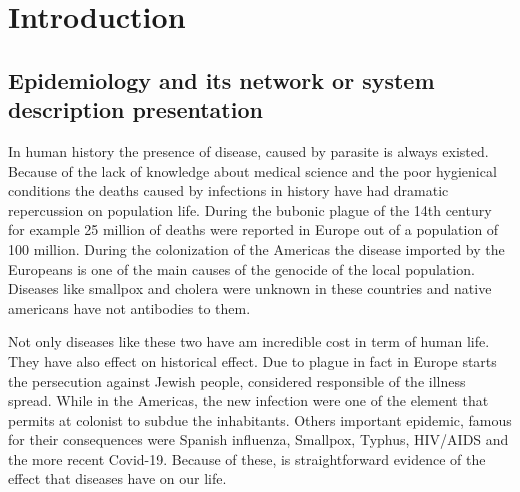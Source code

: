 \part{Introduction}

\chapter{Epidemiology and its network or system description presentation}

In human history the presence of disease, caused by parasite is always existed. 
Because of the lack of knowledge about medical science and the poor hygienical conditions the deaths caused by infections in history  have had dramatic repercussion on population life. During the bubonic plague of the 14th century for example 25 million of deaths were reported in Europe out of a population of 100 million. 
During the colonization of the Americas the disease imported by the Europeans is one of the main causes of the genocide of the local population. Diseases like smallpox and cholera were unknown in these countries and native americans have not antibodies to them. 



Not only diseases like these two have am incredible cost in term of human life. They have also effect on historical effect. Due to plague in fact in Europe starts the persecution against Jewish people, considered responsible of the illness spread. While in the Americas, the new infection were one of the element that permits at colonist to subdue the inhabitants. 
Others important epidemic, famous for their consequences were Spanish influenza, Smallpox, Typhus, HIV/AIDS and the more recent Covid-19. 
Because of these, is straightforward evidence of the effect that diseases have on our life.

